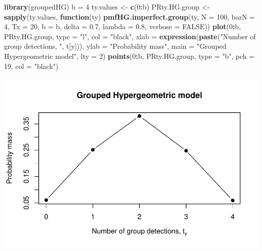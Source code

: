 \documentclass[
]{article}
\newenvironment{Shaded}{\begin{snugshade}}{\end{snugshade}}
\newcommand{\AttributeTok}[1]{\textcolor[rgb]{0.13,0.29,0.53}{#1}}
\newcommand{\ConstantTok}[1]{\textcolor[rgb]{0.56,0.35,0.01}{#1}}
\newcommand{\ControlFlowTok}[1]{\textcolor[rgb]{0.13,0.29,0.53}{\textbf{#1}}}
\newcommand{\DecValTok}[1]{\textcolor[rgb]{0.00,0.00,0.81}{#1}}
\newcommand{\FloatTok}[1]{\textcolor[rgb]{0.00,0.00,0.81}{#1}}
\newcommand{\FunctionTok}[1]{\textcolor[rgb]{0.13,0.29,0.53}{\textbf{#1}}}
\newcommand{\NormalTok}[1]{#1}
\newcommand{\OtherTok}[1]{\textcolor[rgb]{0.56,0.35,0.01}{#1}}
\newcommand{\SpecialCharTok}[1]{\textcolor[rgb]{0.81,0.36,0.00}{\textbf{#1}}}
\newcommand{\StringTok}[1]{\textcolor[rgb]{0.31,0.60,0.02}{#1}}
\begin{document}
\begin{Shaded}
\begin{Highlighting}[]
\FunctionTok{library}\NormalTok{(groupedHG)}
\NormalTok{b }\OtherTok{=} \DecValTok{4}
\NormalTok{ty.values }\OtherTok{\textless{}{-}} \FunctionTok{c}\NormalTok{(}\DecValTok{0}\SpecialCharTok{:}\NormalTok{b)}
\NormalTok{PRty.HG.group }\OtherTok{\textless{}{-}} \FunctionTok{sapply}\NormalTok{(ty.values, }\ControlFlowTok{function}\NormalTok{(ty) }\FunctionTok{pmfHG.imperfect.group}\NormalTok{(ty,}
    \AttributeTok{N =} \DecValTok{100}\NormalTok{, }\AttributeTok{barN =} \DecValTok{4}\NormalTok{, }\AttributeTok{Tx =} \DecValTok{20}\NormalTok{, }\AttributeTok{b =}\NormalTok{ b, }\AttributeTok{delta =} \FloatTok{0.7}\NormalTok{, }\AttributeTok{lambda =} \FloatTok{0.8}\NormalTok{,}
    \AttributeTok{verbose =} \ConstantTok{FALSE}\NormalTok{))}
\FunctionTok{plot}\NormalTok{(}\DecValTok{0}\SpecialCharTok{:}\NormalTok{b, PRty.HG.group, }\AttributeTok{type =} \StringTok{"l"}\NormalTok{, }\AttributeTok{col =} \StringTok{"black"}\NormalTok{, }\AttributeTok{xlab =} \FunctionTok{expression}\NormalTok{(}\FunctionTok{paste}\NormalTok{(}\StringTok{"Number of group detections, "}\NormalTok{,}
\NormalTok{    t[y])), }\AttributeTok{ylab =} \StringTok{"Probability mass"}\NormalTok{, }\AttributeTok{main =} \StringTok{"Grouped Hypergeometric model"}\NormalTok{,}
    \AttributeTok{lty =} \DecValTok{2}\NormalTok{)}
\FunctionTok{points}\NormalTok{(}\DecValTok{0}\SpecialCharTok{:}\NormalTok{b, PRty.HG.group, }\AttributeTok{type =} \StringTok{"b"}\NormalTok{, }\AttributeTok{pch =} \DecValTok{19}\NormalTok{, }\AttributeTok{col =} \StringTok{"black"}\NormalTok{)}
\end{Highlighting}
\end{Shaded}

\includegraphics[width=1\linewidth]{man/figures/README-PMF HG Group-1}
\end{document}
